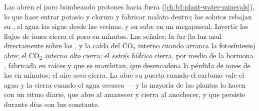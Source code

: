 \begin{proposition}\label{prop:b1:plant-transport:opening}
Las  abren el poro bombeando protones hacia fuera
(\cref{ch:b1:plant-water-minerals}), lo que hace entrar potasio y cloruro y
fabricar malato dentro; los solutos rebajan su , el agua
las sigue desde las  vecinas, y su  sube en un megapascal.
Invertir los flujos de iones cierra el poro en minutos. Las señales: la
\emph{luz} (la luz azul directamente sobre las , y la caída
del $\mathrm{CO_2}$ interno cuando arranca la fotosíntesis) abre; el
\emph{$\mathrm{CO_2}$ interno alto} cierra; el \emph{estrés hídrico} cierra,
por medio de la hormona \emph{}, fabricada en raíces y 
que se marchitan, que desencadena la pérdida de iones de las  en minutos; el aire seco cierra. La  abre su puerta cuando el
carbono vale el agua y la cierra cuando el agua escasea --- y la mayoría de
las plantas lo hacen con un ritmo diario, que abre al amanecer y cierra al
anochecer, y que persiste durante días con luz constante.
\end{proposition}

